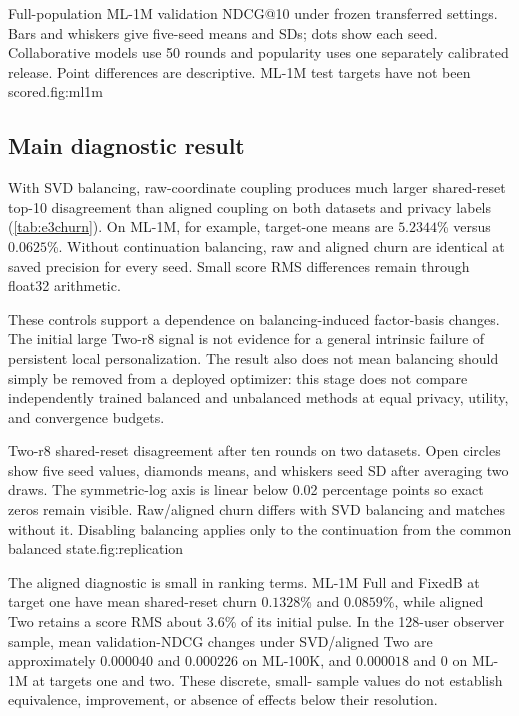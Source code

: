{Full-population ML-1M validation NDCG@10 under frozen transferred settings.
Bars and whiskers give five-seed means and SDs; dots show each seed.
Collaborative models use 50 rounds and popularity uses one separately
calibrated release. Point differences are descriptive. ML-1M test targets
have not been scored.}{fig:ml1m}

\subsection{Main diagnostic result}

With SVD balancing, raw-coordinate coupling produces much larger shared-reset
top-10 disagreement than aligned coupling on both datasets and privacy
labels (\cref{tab:e3churn}). On ML-1M, for example, target-one means are
$5.2344$\% versus $0.0625$\%. Without continuation balancing, raw and
aligned churn are identical at saved precision for every seed. Small score
RMS differences remain through float32 arithmetic.

These controls support a dependence on balancing-induced factor-basis changes.
The initial large Two-r8 signal is not evidence for a general intrinsic
failure of persistent local personalization. The result also does not mean
balancing should simply be removed from a deployed optimizer: this stage
does not compare independently trained balanced and unbalanced methods at
equal privacy, utility, and convergence budgets.

{Two-r8 shared-reset disagreement after ten rounds on two datasets. Open
circles show five seed values, diamonds means, and whiskers seed SD after
averaging two draws. The symmetric-log axis is linear below 0.02 percentage
points so exact zeros remain visible. Raw/aligned churn differs with SVD
balancing and matches without it. Disabling balancing applies only to the
continuation from the common balanced state.}{fig:replication}

The aligned diagnostic is small in ranking terms. ML-1M Full and FixedB at
target one have mean shared-reset churn $0.1328$\% and $0.0859$\%, while
aligned Two retains a score RMS about $3.6$\% of its initial pulse. In the
128-user observer sample, mean validation-NDCG changes under SVD/aligned
Two are approximately $0.000040$ and $0.000226$ on ML-100K, and
$0.000018$ and $0$ on ML-1M at targets one and two. These discrete, small-
sample values do not establish equivalence, improvement, or absence of
effects below their resolution.

